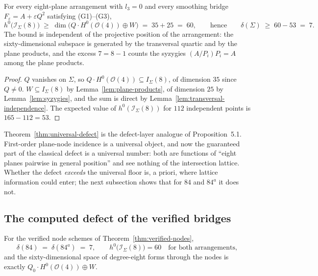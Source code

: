 \begin{theorem}\label{thm:universal-defect}
For every eight-plane arrangement with $l_3 = 0$ and every smoothing bridge
$F_\varepsilon = A + \varepsilon Q^2$ satisfying (G1)--(G3),
\[
  h^0\!\bigl(\mathcal{I}_\Sigma(8)\bigr) \;\geq\;
  \dim \bigl( Q \cdot H^0(\mathcal{O}(4)) \oplus W \bigr)
  \;=\; 35 + 25 \;=\; 60,
  \qquad\text{hence}\qquad
  \delta(\Sigma) \;\geq\; 60 - 53 \;=\; 7 .
\]
The bound is independent of the projective position of the arrangement: the
sixty-dimensional subspace is generated by the transversal quartic and by
the plane products, and the excess $7 = 8 - 1$ counts the syzygies
$(A/P_i)P_i = A$ among the plane products.
\end{theorem}

\begin{proof}
$Q$ vanishes on $\Sigma$, so $Q \cdot H^0(\mathcal{O}(4)) \subseteq
I_\Sigma(8)$, of dimension $35$ since $Q \neq 0$. $W \subseteq I_\Sigma(8)$
by Lemma~\ref{lem:plane-products}, of dimension $25$ by
Lemma~\ref{lem:syzygies}, and the sum is direct by
Lemma~\ref{lem:transversal-independence}. The expected value of
$h^0(\mathcal{I}_\Sigma(8))$ for $112$ independent points is
$165 - 112 = 53$.
\end{proof}

\begin{remark}\label{rem:defect-lattice-blind}
Theorem~\ref{thm:universal-defect} is the defect-layer analogue of
Proposition~5.1. First-order plane-node incidence is a universal object,
and now the guaranteed part of the classical defect is a universal number:
both are functions of ``eight planes pairwise in general position'' and see
nothing of the intersection lattice. Whether the defect \emph{exceeds} the
universal floor is, a priori, where lattice information could enter; the
next subsection shows that for $84$ and $84^{a}$ it does not.
\end{remark}

\subsection{The computed defect of the verified bridges}
\label{sec:computed-defect}

\begin{theorem}\label{thm:defect-computed}
For the verified node schemes of Theorem~\ref{thm:verified-nodes},
\[
  \delta(84) \;=\; \delta(84^{a}) \;=\; 7 ,
  \qquad
  h^0\!\bigl(\mathcal{I}_\Sigma(8)\bigr) = 60
  \quad\text{for both arrangements},
\]
and the sixty-dimensional space of degree-eight forms through the nodes is
exactly $Q_0 \cdot H^0(\mathcal{O}(4)) \oplus W$.
\end{theorem}

